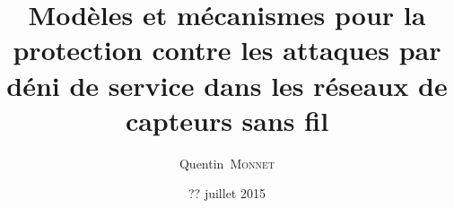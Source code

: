 \author{Quentin~\textsc{Monnet}}
\title{Modèles et mécanismes pour la protection contre les attaques par déni de service dans les réseaux de capteurs sans fil}
\date{?? juillet 2015}

